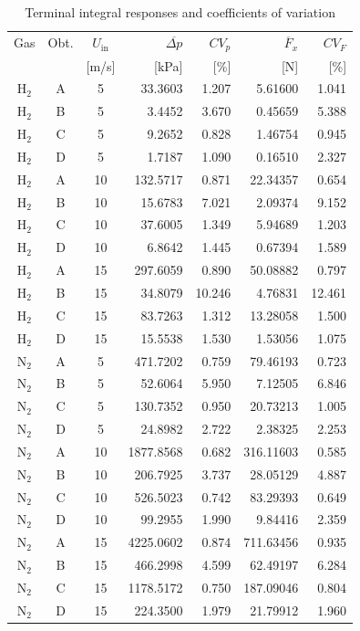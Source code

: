\begin{table}[H]
\centering\small
\setlength{\tabcolsep}{5pt}
\begin{tabular}{@{}cccrrrr@{}}
\toprule
Gas & Obt. & $U_{\mathrm{in}}$ & $\overline{\Delta p}$ & $CV_p$ & $\overline F_x$ & $CV_F$\\
 & & [m/s] & [kPa] & [\%] & [N] & [\%]\\
\midrule
$\mathrm{H}_2$ & A & 5 & 33.3603 & 1.207 & 5.61600 & 1.041\\
$\mathrm{H}_2$ & B & 5 & 3.4452 & 3.670 & 0.45659 & 5.388\\
$\mathrm{H}_2$ & C & 5 & 9.2652 & 0.828 & 1.46754 & 0.945\\
$\mathrm{H}_2$ & D & 5 & 1.7187 & 1.090 & 0.16510 & 2.327\\
$\mathrm{H}_2$ & A & 10 & 132.5717 & 0.871 & 22.34357 & 0.654\\
$\mathrm{H}_2$ & B & 10 & 15.6783 & 7.021 & 2.09374 & 9.152\\
$\mathrm{H}_2$ & C & 10 & 37.6005 & 1.349 & 5.94689 & 1.203\\
$\mathrm{H}_2$ & D & 10 & 6.8642 & 1.445 & 0.67394 & 1.589\\
$\mathrm{H}_2$ & A & 15 & 297.6059 & 0.890 & 50.08882 & 0.797\\
$\mathrm{H}_2$ & B & 15 & 34.8079 & 10.246 & 4.76831 & 12.461\\
$\mathrm{H}_2$ & C & 15 & 83.7263 & 1.312 & 13.28058 & 1.500\\
$\mathrm{H}_2$ & D & 15 & 15.5538 & 1.530 & 1.53056 & 1.075\\
\midrule
$\mathrm{N}_2$ & A & 5 & 471.7202 & 0.759 & 79.46193 & 0.723\\
$\mathrm{N}_2$ & B & 5 & 52.6064 & 5.950 & 7.12505 & 6.846\\
$\mathrm{N}_2$ & C & 5 & 130.7352 & 0.950 & 20.73213 & 1.005\\
$\mathrm{N}_2$ & D & 5 & 24.8982 & 2.722 & 2.38325 & 2.253\\
$\mathrm{N}_2$ & A & 10 & 1877.8568 & 0.682 & 316.11603 & 0.585\\
$\mathrm{N}_2$ & B & 10 & 206.7925 & 3.737 & 28.05129 & 4.887\\
$\mathrm{N}_2$ & C & 10 & 526.5023 & 0.742 & 83.29393 & 0.649\\
$\mathrm{N}_2$ & D & 10 & 99.2955 & 1.990 & 9.84416 & 2.359\\
$\mathrm{N}_2$ & A & 15 & 4225.0602 & 0.874 & 711.63456 & 0.935\\
$\mathrm{N}_2$ & B & 15 & 466.2998 & 4.599 & 62.49197 & 6.284\\
$\mathrm{N}_2$ & C & 15 & 1178.5172 & 0.750 & 187.09046 & 0.804\\
$\mathrm{N}_2$ & D & 15 & 224.3500 & 1.979 & 21.79912 & 1.960\\
\bottomrule
\end{tabular}
\caption{Terminal integral responses and coefficients of variation}
\label{tab:app_responses}
\end{table}

